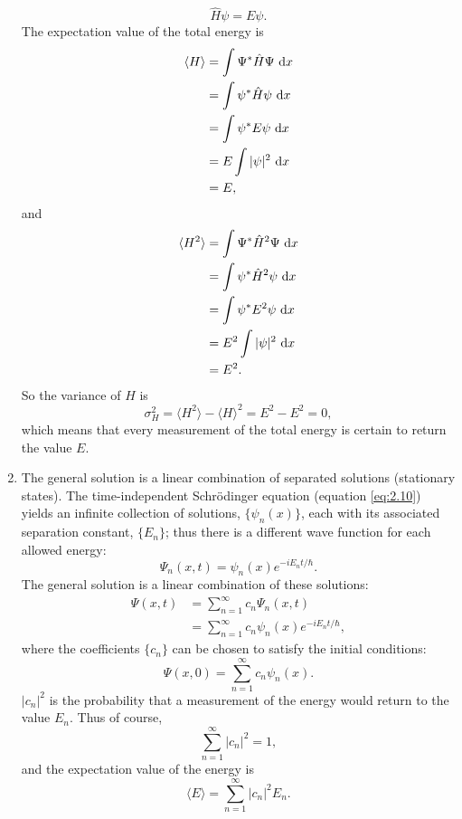\documentclass[en, oneside]{vivi}
\begin{document}
\begin{enumerate}
\begin{equation}
        \hat{H} \psi = E \psi.
    \end{equation}
    The expectation value of the total energy is
    \begin{align}
        \langle H \rangle &= \int \Psi^* \hat{H} \Psi \dif x\\
        &= \int \psi^* \hat{H} \psi \dif x\\
        &= \int \psi^* E \psi \dif x\\
        &= E \int |\psi|^2 \dif x\\
        &= E,
    \end{align}
    and
    \begin{align}
        \langle H^2 \rangle &= \int \Psi^* \hat{H}^2 \Psi \dif x\\
        &= \int \psi^* \hat{H}^2 \psi \dif x\\
        &= \int \psi^* E^2 \psi \dif x\\
        &= E^2 \int |\psi|^2 \dif x\\
        &= E^2.
    \end{align}
    So the variance of $H$ is
    \begin{equation}
        \sigma_H^2 = \langle H^2 \rangle - \langle H \rangle^2 = E^2 - E^2 = 0,
    \end{equation}
    which means that every measurement of the total energy is certain to return the value $E$.
    \item The general solution is a linear combination of separated solutions (stationary states).
    The time-independent Schrödinger equation (equation \eqref{eq:2.10}) yields an infinite collection of solutions, $\{ \psi_n(x) \}$, 
    each with its associated separation constant, $\{ E_n \}$; thus there is a different wave function for each allowed energy:
    \begin{equation}
        \Psi_n(x, t) = \psi_n(x) e^{-iE_nt/\hbar}.
    \end{equation}
    The general solution is a linear combination of these solutions:
    \begin{align}
        \Psi(x, t) &= \sum_{n=1}^\infty c_n \Psi_n(x, t)\label{eq:general solution}\\ 
        &= \sum_{n=1}^\infty c_n \psi_n(x) e^{-iE_nt/\hbar},
    \end{align}
    where the coefficients $\{ c_n \}$ can be chosen to satisfy the initial conditions:
    \begin{equation}
        \Psi(x, 0) = \sum_{n=1}^\infty c_n \psi_n(x).
    \end{equation}
    $| c_n |^2$ is the probability that a measurement of the energy would return to the value $E_n$. Thus of course,
    \begin{equation}
        \sum_{n=1}^\infty | c_n |^2 = 1,
    \end{equation}
    and the expectation value of the energy is
    \begin{equation}
        \langle E \rangle = \sum_{n=1}^\infty | c_n |^2 E_n.
    \end{equation}
\end{enumerate}
\end{document}
